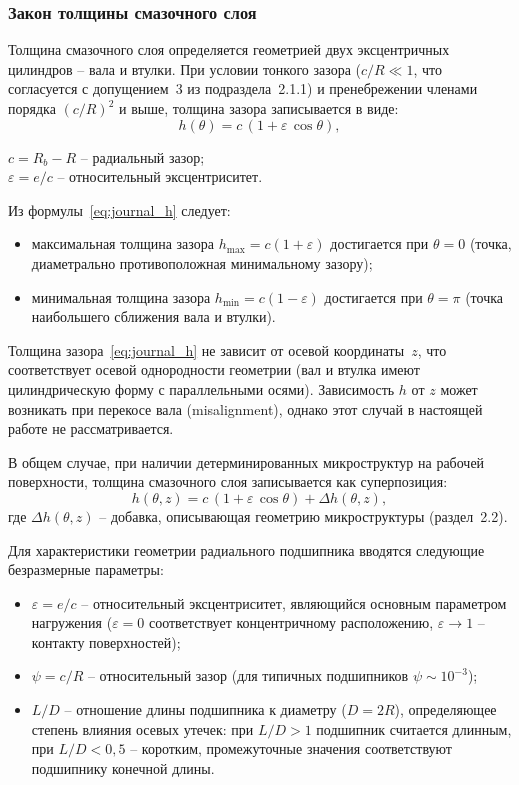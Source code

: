 \subsubsection*{Закон толщины смазочного слоя}

Толщина смазочного слоя определяется геометрией двух эксцентричных цилиндров -- вала и втулки. При условии тонкого зазора ($c/R \ll 1$, что согласуется с допущением~3 из подраздела~2.1.1) и пренебрежении членами порядка $(c/R)^2$ и выше, толщина зазора записывается в виде:
\begin{equation}
h(\theta) = c\,(1 + \varepsilon\,\cos\theta),
\label{eq:journal_h}
\end{equation}
\begin{conditions}
$c = R_b - R$ -- радиальный зазор;\\
$\varepsilon = e/c$ -- относительный эксцентриситет.
\end{conditions}
Из формулы~\eqref{eq:journal_h} следует:
\begin{itemize}
\item максимальная толщина зазора $h_{\max} = c(1 + \varepsilon)$ достигается при $\theta = 0$ (точка, диаметрально противоположная минимальному зазору);
\item минимальная толщина зазора $h_{\min} = c(1 - \varepsilon)$ достигается при $\theta = \pi$ (точка наибольшего сближения вала и втулки).
\end{itemize}

Толщина зазора~\eqref{eq:journal_h} не зависит от осевой координаты~$z$, что соответствует осевой однородности геометрии (вал и втулка имеют цилиндрическую форму с параллельными осями). Зависимость $h$ от $z$ может возникать при перекосе вала (misalignment), однако этот случай в настоящей работе не рассматривается.

В общем случае, при наличии детерминированных микроструктур на рабочей поверхности, толщина смазочного слоя записывается как суперпозиция:
\begin{equation}
h(\theta, z) = c\,(1 + \varepsilon\,\cos\theta) + \Delta h(\theta, z),
\label{eq:journal_h_textured}
\end{equation}
где $\Delta h(\theta, z)$ -- добавка, описывающая геометрию микроструктуры (раздел~2.2).

Для характеристики геометрии радиального подшипника вводятся следующие безразмерные параметры:
\begin{itemize}
\item $\varepsilon = e/c$ -- относительный эксцентриситет, являющийся основным параметром нагружения ($\varepsilon = 0$ соответствует концентричному расположению, $\varepsilon \to 1$ -- контакту поверхностей);
\item $\psi = c/R$ -- относительный зазор (для типичных подшипников $\psi \sim 10^{-3}$);
\item $L/D$ -- отношение длины подшипника к диаметру ($D = 2R$), определяющее степень влияния осевых утечек: при $L/D > 1$ подшипник считается длинным, при $L/D < 0{,}5$ -- коротким, промежуточные значения соответствуют подшипнику конечной длины.
\end{itemize}


